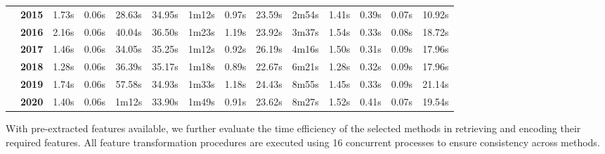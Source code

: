 \begin{table}[t]
\begin{adjustbox}{width=0.98\textwidth}
\begin{tabular}{@{}cclc|c|c|c|c|c|c|c|c|c|c|c@{}}
    \multicolumn{1}{c|}{} & \multicolumn{2}{c|}{\textbf{2015}} & 1.73s   & 0.06s & 28.63s  & 34.95s & 1m12s  & 0.97s & 23.59s   & 2m54s   & 1.41s  & 0.39s   & 0.07s  & 10.92s  \\ \cmidrule(l){2-15} 
    \multicolumn{1}{c|}{} & \multicolumn{2}{c|}{\textbf{2016}} & 2.16s   & 0.06s & 40.04s  & 36.50s & 1m23s  & 1.19s & 23.92s   & 3m37s   & 1.54s  & 0.33s   & 0.08s  & 18.72s  \\ \cmidrule(l){2-15} 
    \multicolumn{1}{c|}{} & \multicolumn{2}{c|}{\textbf{2017}} & 1.46s   & 0.06s & 34.05s  & 35.25s & 1m12s  & 0.92s & 26.19s   & 4m16s   & 1.50s  & 0.31s   & 0.09s  & 17.96s  \\ \cmidrule(l){2-15} 
    \multicolumn{1}{c|}{} & \multicolumn{2}{c|}{\textbf{2018}} & 1.28s   & 0.06s & 36.39s  & 35.17s & 1m18s  & 0.89s & 22.67s   & 6m21s   & 1.28s  & 0.32s   & 0.09s  & 17.96s  \\ \cmidrule(l){2-15} 
    \multicolumn{1}{c|}{} & \multicolumn{2}{c|}{\textbf{2019}} & 1.74s   & 0.06s & 57.58s  & 34.93s & 1m33s  & 1.18s & 24.43s   & 8m55s   & 1.45s  & 0.33s   & 0.09s  & 21.14s  \\ \cmidrule(l){2-15} 
    \multicolumn{1}{c|}{} & \multicolumn{2}{c|}{\textbf{2020}} & 1.40s   & 0.06s & 1m12s   & 33.90s & 1m49s  & 0.91s & 23.62s   & 8m27s   & 1.52s  & 0.41s   & 0.07s  & 19.54s  \\ \bottomrule
    \end{tabular}
    \end{adjustbox}
    \label{tab:efficiency_ml_modeling}
\vspace{-0.3cm}
\end{table}

With pre-extracted features available, we further evaluate the time efficiency of the selected methods in retrieving and encoding their required features. All feature transformation procedures are executed using 16 concurrent processes to ensure consistency across methods.

